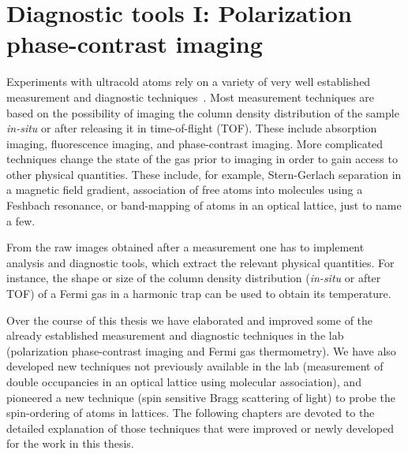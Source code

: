 \chapter{Diagnostic tools I: Polarization phase-contrast imaging}

Experiments with ultracold atoms rely on a variety of very well established
measurement and diagnostic techniques~\cite{Making1999,Making2007}.  Most
measurement techniques are based on the possibility of imaging the column
density distribution of the sample \textit{in-situ} or after releasing it in
time-of-flight (TOF).  These include absorption imaging, fluorescence imaging,
and phase-contrast imaging.  More complicated techniques change the state of
the gas prior to imaging in order to gain access to other physical quantities.
These include, for example, Stern-Gerlach
separation in a magnetic field gradient, association of free atoms into
molecules using a Feshbach resonance, or band-mapping of atoms in an optical
lattice, just to name a few. 

From the raw images obtained after a measurement one has to implement analysis
and diagnostic tools, which extract the relevant physical quantities.  For
instance, the shape or size of the column density distribution
(\textit{in-situ} or after TOF) of a Fermi gas in a harmonic trap  can be used
to obtain its temperature. 

Over the course of this thesis we have elaborated and improved some of the
already established measurement and diagnostic techniques in the lab
(polarization phase-contrast imaging and Fermi gas thermometry).   We have also
developed new techniques not previously available in the lab (measurement of
double occupancies in an optical lattice using molecular association),  and
pioneered a new technique (spin sensitive Bragg scattering of light) to probe
the spin-ordering of atoms in lattices.  The following chapters are devoted to
the detailed explanation of those techniques that were improved or newly
developed for the work in this thesis.    

